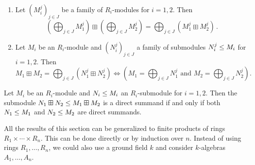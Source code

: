 \begin{lemma}
  \leavevmode
  \begin{enumerate}
    \item
      Let $(M^j_i)_{j \in J}$ be a family of $R_i$-modules for $i = 1, 2$.
      Then
      \[
            \left( \bigoplus_{j \in J} M^j_1 \right) \boxplus \left( \bigoplus_{j \in J} M^j_2 \right)
          = \bigoplus_{j \in J} (M^j_1 \boxplus M^j_2) \,.
      \]
    \item
      Let $M_i$ be an $R_i$-module and $(N^j_i)_{j \in J}$ a family of submodules $N^j_i \leq M_i$ for $i = 1, 2$.
      Then
      \[
              M_1 \boxplus M_2 = \bigoplus_{j \in J} \left( N^j_1 \boxplus N^j_2 \right)
        \iff  \left(
                \text{$M_1  = \bigoplus_{j \in J} N^j_1$ and $M_2  = \bigoplus_{j \in J} N^j_2$}
              \right).
      \]
  \end{enumerate}
\end{lemma}


\begin{corollary}
  Let $M_i$ be an $R_i$-module and $N_i \leq M_i$ an $R_i$-submodule for $i = 1, 2$.
  Then the submodule $N_1 \boxplus N_2 \leq M_1 \boxplus M_2$ is a direct summand if and only if both $N_1 \leq M_1$ and $N_2 \leq M_2$ are direct summands.
\end{corollary}


\begin{remark}
  All the results of this section can be generalized to finite products of rings $R_1 \times \dotsb \times R_n$.
  This can be done directly or by induction over $n$.
  Instead of using rings $R_1, \dotsc, R_n$, we could also use a ground field $k$ and consider $k$-algebras $A_1, \dotsc, A_n$.
\end{remark}


